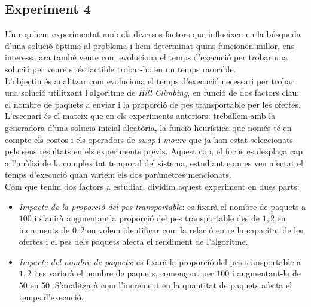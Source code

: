 \documentclass[a4paper]{article}
\begin{document}
	\subsection{Experiment 4}

	Un cop hem experimentat amb els diversos factors que influeixen en la búsqueda d'una solució òptima al problema i hem determinat quins funcionen millor, ens interessa ara també veure com evoluciona el temps d'execució per trobar una solució per veure si és factible trobar-ho en un temps raonable.\\

	L'objectiu és analitzar com evoluciona el temps d'execució necessari per trobar una solució utilitzant l'algoritme de \textit{Hill Climbing}, en funció de dos factors clau: el nombre de paquets a enviar i la proporció de pes transportable per les ofertes. \\

	L'escenari és el mateix que en els experiments anteriors: treballem amb la generadora d'una solució inicial aleatòria, la funció heurística que només té en compte els costos i els operadors de \textit{swap} i \textit{moure} que ja han estat seleccionats pels seus resultats en els experiments previs. Aquest cop, el focus es desplaça cap a l'anàlisi de la complexitat temporal del sistema, estudiant com es veu afectat el temps d'execució quan variem els dos paràmetres mencionats. \\

	Com que tenim dos factors a estudiar, dividim aquest experiment en dues parts:
	\begin{itemize}
		\item \emph{Impacte de la proporció del pes transportable}: es fixarà el nombre de paquets a $100$ i s'anirà augmentantla proporció del pes transportable des de $1,2$ en increments de $0,2$ on volem identificar com la relació entre la capacitat de les ofertes i el pes dels paquets afecta el rendiment de l'algoritme.

		\item \emph{Impacte del nombre de paquets}: es fixarà la proporció del pes transportable a $1,2$ i es variarà el nombre de paquets, començant per $100$ i augmentant-lo de $50$ en $50$. S'analitzarà com l'increment en la quantitat de paquets afecta el temps d'execució.

	\end{itemize}
\end{document}
